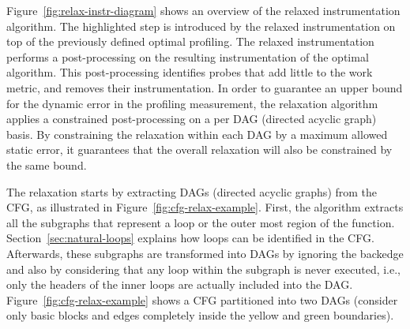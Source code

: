 \documentclass[sigplan,10pt]{acmart}
\theoremstyle{definition}
\begin{document}

Figure~\ref{fig:relax-instr-diagram} shows an overview of the relaxed instrumentation algorithm.
The highlighted step is introduced by the relaxed instrumentation on top of the previously defined optimal profiling.
The relaxed instrumentation performs a post-processing on the resulting instrumentation of the optimal algorithm.
This post-processing identifies probes that add little to the work metric, and removes their instrumentation.
In order to guarantee an upper bound for the dynamic error in the profiling measurement, the relaxation algorithm applies a constrained post-processing on a per DAG (directed acyclic graph) basis.
By constraining the relaxation within each DAG by a maximum allowed static error, it guarantees that the overall relaxation will also be constrained by the same bound.


The relaxation starts by extracting DAGs (directed acyclic graphs) from the CFG, as illustrated in Figure~\ref{fig:cfg-relax-example}.
First, the algorithm extracts all the subgraphs that represent a loop or the outer most region of the function.
Section~\ref{sec:natural-loops} explains how loops can be identified in the CFG.
Afterwards, these subgraphs are transformed into DAGs by ignoring the backedge and also by considering that any loop within the subgraph is never executed, i.e., only the headers of the inner loops are actually included into the DAG.
Figure~\ref{fig:cfg-relax-example} shows a CFG partitioned into two DAGs (consider only basic blocks and edges completely inside the yellow and green boundaries).
%
%
\end{document}
